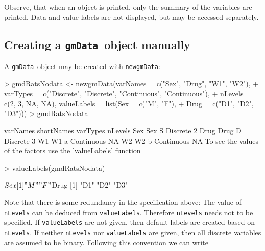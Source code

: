 \documentclass{article}
\def\code#1{\texttt{#1}}
\def\gmData            {\code{gmData}}
\def\gmData             {\code{gmData}}
\begin{document}
\normalsize
Observe, that when an object is printed, only the summary of the
variables are printed. Data and value labels are not displayed, but
may be accessed separately.

\subsection[Creating a gmData object manually]%
{Creating a \protect\gmData\ object manually}

A \gmData\ object may be created with \code{newgmData}:
\footnotesize 
\begin{Schunk}
\begin{Sinput}
> gmdRatsNodata <- newgmData(varNames = c("Sex", "Drug", "W1", "W2"), 
+     varTypes = c("Discrete", "Discrete", "Continuous", "Continuous"), 
+     nLevels = c(2, 3, NA, NA), valueLabels = list(Sex = c("M", "F"), 
+         Drug = c("D1", "D2", "D3")))
> gmdRatsNodata
\end{Sinput}
\begin{Soutput}
     varNames shortNames   varTypes nLevels
Sex       Sex          S   Discrete       2
Drug     Drug          D   Discrete       3
W1         W1          a Continuous      NA
W2         W2          b Continuous      NA
To see the values of the factors use the 'valueLabels' function
\end{Soutput}
\begin{Sinput}
> valueLabels(gmdRatsNodata)
\end{Sinput}
\begin{Soutput}
$Sex
[1] "M" "F"

$Drug
[1] "D1" "D2" "D3"
\end{Soutput}
\end{Schunk}
\normalsize


Note that there is some redundancy in the specification above: The
value of \code{nLevels} can be deduced from \code{valueLabels}.
Therefore \code{nLevels} needs not to be specified. If
\code{valueLabels} are not given, then default labels are created
based on \code{nLevels}. If neither \code{nLevels} nor
\code{valueLabels} are given, then all discrete variables are assumed
to be binary. Following this convention we can write
\end{document}
